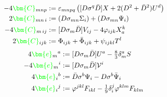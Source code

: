 \documentclass[letter,12pt]{article} %
\def\physical#1{ {\color{green} {\bm {#1}} } }
\def\frameXX{ \physical{e} }
\def\frameXY{ \physical{e} }
\def\frameYX{ \physical{e} }
\def\frameYY{ \physical{e} }
\def\CXXX{ \physical{C} }
\def\CXXY{ \physical{C} }
\def\CXYY{ \physical{C} }
\def\CYYY{ \physical{C} }
\def\grinoXX{ \physical{\psi} }
\def\grinoXY{ \physical{\psi} }
\def\grinoYX{ \physical{\psi} }
\def\grinoYY{ \physical{\psi} }
\def\spinorYY{ \physical{\chi} }
\def\spinorYYY{ \physical{\chi} }
\def\X{X}
\def\T{T}
\begin{document}
{%
\begin{align}
-4 \CXXX_{mnp}&:= \varepsilon_{mnpq}\left(
	 [D\sigma^q\bar D] X
	+2(D^2 +\bar D^2) U^d
	\right)
\cr
2\CXXY_{mn \, i}  &:= (D\sigma_{mn}\Sigma_{i} ) 
	+ (D\sigma_{mn}\Psi_{ i})
\cr
-4 \CXYY_{m\, ij}&:= 
	[D\sigma_m \bar D] V_{ij} -4 \varphi_{ijk} \X_{a}^k
\cr
2 \CYYY_{ijk} &:= \Phi_{ijk} + \bar \Phi_{ijk} +\psi_{ijkl} \T^l
\nonumber
\end{align}
\begin{align}
4\frameXX_m{}^a &:=
	[D\sigma_m \bar D]U^{a} 
	-\tfrac83  \delta_m^a S
\cr
-4 \frameXY_m{}^i &:= 
	[D\sigma_m \bar D]\mathcal V^i 
\cr
4 \frameYX_i{}^b &:=
	 \bar D \sigma^b \Psi_{i} - D \sigma^b \bar \Psi_{ i}
\cr
4\frameYY_i{}^j&:=  \varphi^{j kl} F_{ikl} 
	- \tfrac1{9} \delta_i^j \varphi^{klm} F_{klm}
\nonumber
\end{align}
}
\end{document}
